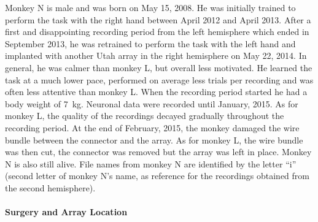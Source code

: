 {Monkey N is male and was born on May 15, 2008. He was initially trained to perform the task with the right hand between April 2012 and April 2013. After a first and disappointing recording period from the left hemisphere which ended in September 2013, he was retrained to perform the task with the left hand and implanted with another Utah array in the right hemisphere on May 22, 2014. In general, he was calmer than monkey L, but overall less motivated. He learned the task at a much lower pace, performed on average less trials per recording and was often less attentive than monkey L. When the recording period started he had a body weight of 7 kg. Neuronal data were recorded until January, 2015. As for monkey L, the quality of the recordings decayed gradually throughout the recording period. At the end of February, 2015, the monkey damaged the wire bundle between the connector and the array. As for monkey L, the wire bundle was then cut, the connector was removed but the array was left in place. Monkey N is also still alive. File names from monkey N are identified by the letter “i” (second letter of monkey N’s name, as reference for the recordings obtained from the second hemisphere). 

\paragraph{Surgery and Array Location}

}

